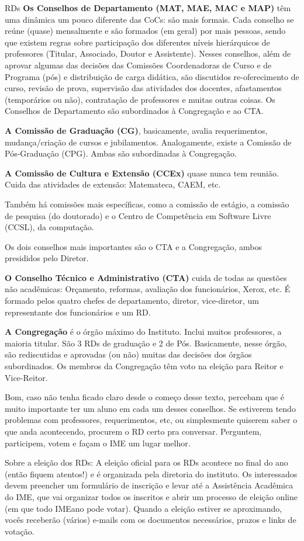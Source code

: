 \begin{subsecao}{RDs}
{\bf Os Conselhos de Departamento (MAT, MAE, MAC e MAP)} têm uma dinâmica um
pouco diferente das CoCs: são mais formais. Cada conselho se reúne (quase)
mensalmente e são formados (em geral) por mais pessoas, sendo que existem
regras sobre participação dos diferentes níveis hierárquicos de
professores (Titular, Associado, Doutor e Assistente). Nesses conselhos, além
de aprovar algumas das decisões das Comissões Coordenadoras de Curso e de
Programa (pós) e distribuição de carga didática, são discutidos re-oferecimento
de curso, revisão de prova, supervisão das atividades dos docentes,
afastamentos (temporários ou não), contratação de professores e muitas outras
coisas.
Os Conselhos de Departamento são subordinados à Congregação e ao CTA.

{\bf A Comissão de Graduação (CG)}, basicamente, avalia requerimentos,
mudança/criação de cursos e jubilamentos. Analogamente, existe a Comissão de
Pós-Graduação (CPG). Ambas são subordinadas à Congregação.

{\bf A Comissão de Cultura e Extensão (CCEx)} quase nunca tem reunião. Cuida
das atividades de extensão: Matemateca, CAEM, etc.

Também há comissões mais específicas, como a comissão de estágio, a comissão de
pesquisa (do doutorado) e o Centro de Competência em Software Livre (CCSL), da
computação.

Os dois conselhos mais importantes são o CTA e a Congregação, ambos presididos
pelo Diretor.

{\bf O Conselho Técnico e Administrativo (CTA)} cuida de todas as questões não
acadêmicas: Orçamento, reformas, avaliação dos funcionários, Xerox, etc. É
formado pelos quatro chefes de departamento, diretor, vice-diretor, um
representante dos funcionários e um RD.

{\bf A Congregação} é o órgão máximo do Instituto. Inclui muitos professores, a
maioria titular. São 3 RDs de graduação e 2 de Pós. Basicamente,
nesse órgão, são rediscutidas e aprovadas (ou não) muitas das decisões
dos órgãos subordinados. Os membros da Congregação têm voto na eleição para
Reitor e Vice-Reitor.

Bom, caso não tenha ficado claro desde o começo desse texto, percebam que é
muito importante ter um aluno em cada um desses conselhos. Se estiverem tendo
problemas com professores, requerimentos, etc, ou simplesmente quiserem saber
o que anda acontecendo, procurem o RD certo pra conversar. Perguntem,
participem, votem e façam o IME um lugar melhor.

Sobre a eleição dos RDs: A eleição oficial para os RDs acontece no final do ano
(então fiquem atentos!) e é organizada pela diretoria do instituto. Os
interessados devem preencher um formulário de inscrição e levar até a
Assistência Acadêmica do IME, que vai organizar todos os inscritos e abrir um
processo de eleição online (em que todo IMEano pode votar). Quando a eleição
estiver se aproximando, vocês receberão (vários) e-mails com os documentos
necessários, prazos e links de votação.

\end{subsecao}

